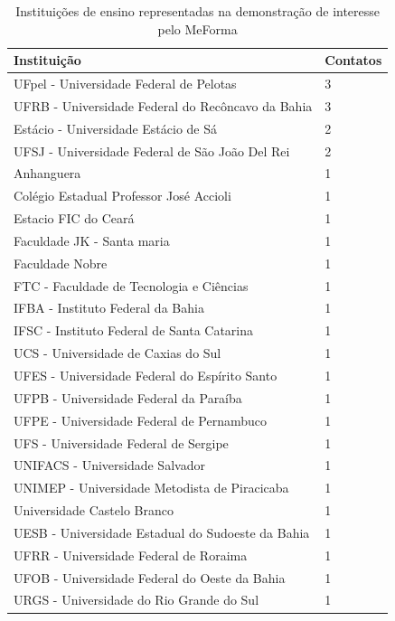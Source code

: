 \begin{table}[H]
\begin{center}
\begin{tabular}{ |p{10cm}|p{2cm}| }
\hline
Instituição & Contatos \\
\hline
UFpel - Universidade Federal de Pelotas  & 3 \\
\hline
UFRB - Universidade Federal do Recôncavo da Bahia & 3 \\
\hline
Estácio - Universidade Estácio de Sá & 2 \\
\hline
UFSJ - Universidade Federal de São João Del Rei & 2 \\
\hline
Anhanguera & 1 \\
\hline
Colégio Estadual Professor José Accioli & 1 \\
\hline
Estacio FIC do Ceará & 1 \\
\hline
Faculdade JK - Santa maria & 1 \\
\hline
Faculdade Nobre & 1 \\
\hline
FTC - Faculdade de Tecnologia e Ciências& 1 \\
\hline
IFBA - Instituto Federal da Bahia & 1 \\
\hline
IFSC - Instituto Federal de Santa Catarina & 1 \\
\hline
UCS - Universidade de Caxias do Sul & 1 \\
\hline
UFES - Universidade Federal do Espírito Santo & 1 \\
\hline
UFPB - Universidade Federal da Paraíba & 1 \\
\hline
UFPE - Universidade Federal de Pernambuco & 1 \\
\hline
UFS - Universidade Federal de Sergipe& 1 \\
\hline
UNIFACS - Universidade Salvador & 1 \\
\hline
UNIMEP - Universidade Metodista de Piracicaba  & 1 \\
\hline
Universidade Castelo Branco & 1 \\
\hline
UESB - Universidade Estadual do Sudoeste da Bahia  & 1 \\
\hline
UFRR - Universidade Federal de Roraima & 1 \\
\hline
UFOB - Universidade Federal do Oeste da Bahia  & 1 \\
\hline
URGS - Universidade do Rio Grande do Sul& 1 \\
\hline
\end{tabular}
\end{center}
\label{interesse}
\caption{Instituições de ensino representadas na demonstração de interesse pelo MeForma}
\end{table}

